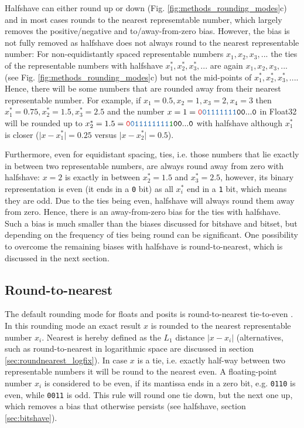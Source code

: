 Halfshave can either round up or down (Fig. \ref{fig:methods_rounding_modes}c) and in most cases rounds to the nearest represemtable
number, which largely removes the positive/negative and to/away-from-zero bias. However, the bias is not fully removed as halfshave does
not always round to the nearest representable number: For non-equidistantly spaced representable numbers $x_1,x_2,x_3,...$ the
ties of the representable numbers with halfshave $x_1^*,x_2^*,x_3^*,...$ are again $x_1,x_2,x_3,...$
(see Fig. \ref{fig:methods_rounding_modes}c) but not the mid-points of $x_1^*,x_2^*,x_3^*,...$.
Hence, there will be some numbers that are rounded away from their nearest representable number.
For example, if $x_1 = 0.5, x_2 = 1, x_3 = 2, x_4 = 3$ then $x_1^* = 0.75,x_2^* = 1.5,x_3^*=2.5$ and the number
$x = 1 = \mathtt{{\color{psign}0}{\color{pexpo}01111111}00...0}$ in Float32 will be rounded up to
$x_2^* = 1.5 = \mathtt{{\color{psign}0}{\color{pexpo}011111111}{\color{mygreen}1}00...0}$ with halfshave although $x_1^*$ is closer
($\vert x - x_1^* \vert = 0.25$ versus $\vert x - x_2^* \vert = 0.5$).

Furthermore, even for equidistant spacing, ties, i.e. those numbers that lie exactly in between two representable numbers, 
are always round away from zero with halfshave: $x = 2$ is exactly in between $x_2^*=1.5$ and $x_3^* = 2.5$, however, 
its binary representation is even (it ends in a \texttt{0} bit) as all $x_i^*$ end in a \texttt{1} bit, which means they are odd.
Due to the ties being even, halfshave will always round them away from zero. Hence, there is an away-from-zero bias
for the ties with halfshave. Such a bias is much smaller than the biases discussed for bitshave and bitset, but depending on
the frequency of ties being round can be significant. One possibility to overcome the remaining biases with halfshave is
round-to-nearest, which is discussed in the next section.

\subsection{Round-to-nearest}
\label{sec:roundnearest}

The default rounding mode for floats and posits is round-to-nearest tie-to-even \citep{IEEE1985}. In this rounding mode an
exact result $x$ is rounded to the nearest representable number $x_i$. Nearest is hereby defined as the $L_1$ distance
$\vert x - x_i \vert$ (alternatives, such as round-to-nearest in logarithmic space are discussed in section
\ref{sec:roundnearest_logfix}). In case $x$ is a tie, i.e. exactly half-way between two representable numbers it will
be round to the nearest even. A floating-point number $x_i$ is considered to be even, if its mantissa ends in a zero bit,
e.g. \texttt{0110} is even, while \texttt{0011} is odd. This rule will round one tie down, but the next one up, which removes
a bias that otherwise persists (see halfshave, section \ref{sec:bitshave}).


